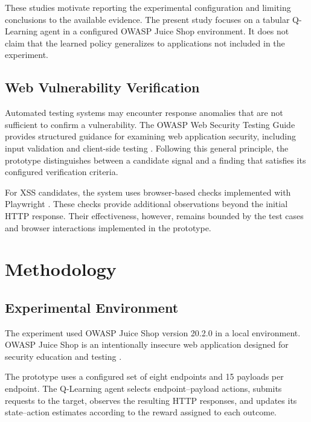 \documentclass[conference]{IEEEtran}
\begin{document}
These studies motivate reporting the experimental
configuration and limiting conclusions to the available
evidence. The present study focuses on a tabular Q-Learning
agent in a configured OWASP Juice Shop environment.
It does not claim that the learned policy generalizes
to applications not included in the experiment.

\subsection{Web Vulnerability Verification}

Automated testing systems may encounter response anomalies
that are not sufficient to confirm a vulnerability.
The OWASP Web Security Testing Guide provides structured
guidance for examining web application security, including
input validation and client-side testing \cite{owaspwstg}.
Following this general principle, the prototype distinguishes
between a candidate signal and a finding that satisfies
its configured verification criteria.

For XSS candidates, the system uses browser-based checks
implemented with Playwright \cite{playwright}. These checks
provide additional observations beyond the initial HTTP
response. Their effectiveness, however, remains bounded
by the test cases and browser interactions implemented
in the prototype.

\section{Methodology}

\subsection{Experimental Environment}

The experiment used OWASP Juice Shop version 20.2.0
in a local environment. OWASP Juice Shop is an intentionally
insecure web application designed for security education
and testing \cite{juiceshop}.

The prototype uses a configured set of eight endpoints
and 15 payloads per endpoint. The Q-Learning agent selects
endpoint--payload actions, submits requests to the target,
observes the resulting HTTP responses, and updates its
state--action estimates according to the reward assigned
to each outcome.
\end{document}
